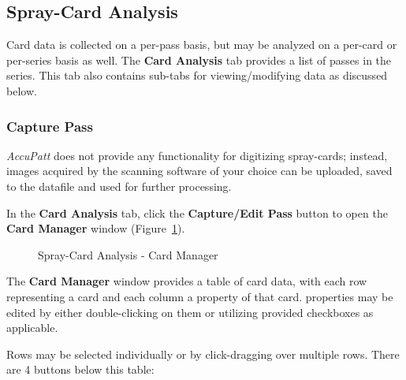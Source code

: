 \documentclass[10pt,letterpaper,titlepage]{article}
\begin{document}
    \subsection{Spray-Card Analysis}
    Card data is collected on a per-pass basis, but may be analyzed on a per-card or per-series basis as well. The \textbf{Card Analysis} tab provides a list of passes in the series. This tab also contains sub-tabs for viewing/modifying data as discussed below.

    \subsubsection{Capture Pass}
    \textit{AccuPatt} does not provide any functionality for digitizing spray-cards; instead, images acquired by the scanning software of your choice can be uploaded, saved to the datafile and used for further processing.\par
    In the \textbf{Card Analysis} tab, click the \textbf{Capture/Edit Pass} button to open the \textbf{Card Manager} window (Figure~\ref{fig:card_manager}).\par 
    \begin{figure}[h]
        \centering
        \caption{Spray-Card Analysis - Card Manager}
        \label{fig:card_manager}
    \end{figure}
    The \textbf{Card Manager} window provides a table of card data, with each row representing a card and each column a property of that card. properties may be edited by either double-clicking on them or utilizing provided checkboxes as applicable.\par
    Rows may be selected individually or by click-dragging over multiple rows. There are 4 buttons below this table:
\end{document}
